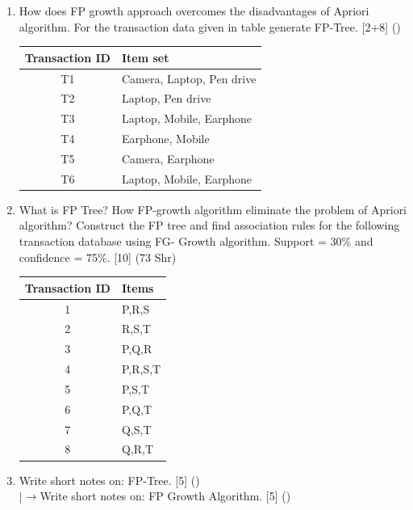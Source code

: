 \documentclass[12pt]{article}
\newcommand{\lb}{\\$\left|\rightarrow\right.$}
\begin{document}
\begin{enumerate}[topsep=0pt, noitemsep]
      \item How does FP growth approach overcomes the disadvantages of Apriori algorithm. For the transaction data given in table generate FP-Tree. \hfill [2+8] ()\\
        \small
        \begin{tabular}{|c|l|}
          \hline
          Transaction ID & Item set \\ \hline
          T1 & Camera, Laptop, Pen drive \\ \hline
          T2 & Laptop, Pen drive \\ \hline
          T3 & Laptop, Mobile, Earphone \\ \hline
          T4 & Earphone, Mobile \\ \hline
          T5 & Camera, Earphone \\ \hline
          T6 & Laptop, Mobile, Earphone \\ \hline
        \end{tabular}
        \normalsize

      \item What is FP Tree? How FP-growth algorithm eliminate the problem of Apriori algorithm? Construct the FP tree and find association rules for the following transaction database using FG- Growth algorithm. Support = 30\% and confidence = 75\%. \hfill [10] (73 Shr)\\
        \small
        \begin{tabular}{|c|l|}
          \hline
          Transaction ID & Items \\ \hline
          1 & P,R,S \\ \hline
          2 & R,S,T \\ \hline
          3 & P,Q,R \\ \hline
          4 & P,R,S,T \\ \hline
          5 & P,S,T \\ \hline
          6 & P,Q,T \\ \hline
          7 & Q,S,T \\ \hline
          8 & Q,R,T \\ \hline
        \end{tabular}
        \normalsize

      \item Write short notes on: FP-Tree. \hfill [5] ()
        \lb Write short notes on: FP Growth Algorithm. \hfill [5] ()
    \end{enumerate}
\end{document}
